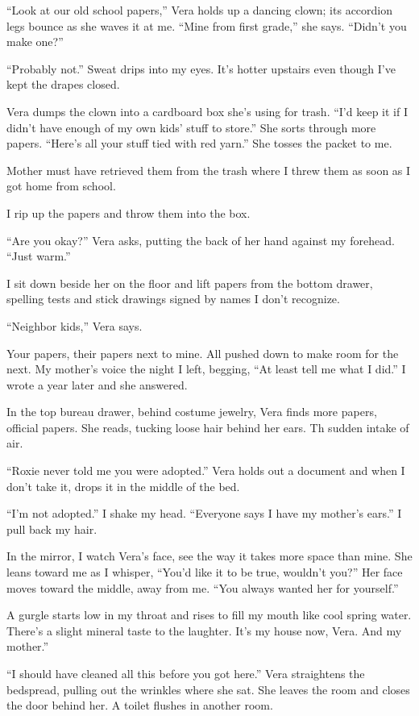 \documentclass[
]{article}
\begin{document}
``Look at our old school papers,'' Vera holds up a dancing clown; its
accordion legs bounce as she waves it at me. ``Mine from first grade,''
she says. ``Didn't you make one?''

``Probably not.'' Sweat drips into my eyes. It's hotter upstairs even
though I've kept the drapes closed.

Vera dumps the clown into a cardboard box she's using for trash. ``I'd
keep it if I didn't have enough of my own kids' stuff to store.'' She
sorts through more papers. ``Here's all your stuff tied with red yarn.''
She tosses the packet to me.

Mother must have retrieved them from the trash where I threw them as
soon as I got home from school.

I rip up the papers and throw them into the box.

``Are you okay?'' Vera asks, putting the back of her hand against my
forehead. ``Just warm.''

I sit down beside her on the floor and lift papers from the bottom
drawer, spelling tests and stick drawings signed by names I don't
recognize.

``Neighbor kids,'' Vera says.

Your papers, their papers next to mine. All pushed down to make room for
the next. My mother's voice the night I left, begging, ``At least tell
me what I did.'' I wrote a year later and she answered.

In the top bureau drawer, behind costume jewelry, Vera finds more
papers, official papers. She reads, tucking loose hair behind her ears.
Th sudden intake of air.

``Roxie never told me you were adopted.'' Vera holds out a document and
when I don't take it, drops it in the middle of the bed.

``I'm not adopted.'' I shake my head. ``Everyone says I have my mother's
ears.'' I pull back my hair.

In the mirror, I watch Vera's face, see the way it takes more space than
mine. She leans toward me as I whisper, ``You'd like it to be true,
wouldn't you?'' Her face moves toward the middle, away from me. ``You
always wanted her for yourself.''

A gurgle starts low in my throat and rises to fill my mouth like cool
spring water. There's a slight mineral taste to the laughter. It's my
house now, Vera. And my mother.''

``I should have cleaned all this before you got here.'' Vera straightens
the bedspread, pulling out the wrinkles where she sat. She leaves the
room and closes the door behind her. A toilet flushes in another room.
\end{document}
